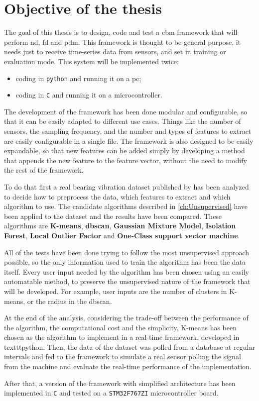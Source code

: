 \section{Objective of the thesis}
\label{sec:objectives}

The goal of this thesis is to design, code and test a \gls{cbm} framework that will perform \gls{nd}, \gls{fd} and \gls{pdm}. This framework is thought to be general purpose, it needs just to receive time-series data from sensors, and set in training or evaluation mode.
This system will be implemented twice:
\begin{itemize}
    \item  coding in \texttt{python} and running it on a \gls{pc};
    \item   coding in \texttt{C} and running it on a microcontroller.
\end{itemize}

The development of the framework has been done modular and configurable, so that it can be easily adapted to different use cases. Things like the number of sensors, the sampling frequency, and the number and types of features to extract are easily configurable in a single file. The framework is also designed to be easily expandable, so that new features can be added simply by developing a method that appends the new feature to the feature vector, without the need to modify the rest of the framework.

To do that first a real bearing vibration dataset published by \cite{IMSpaper} has been analyzed to decide how to preprocess the data, which features to extract and which algorithm to use. 
The candidate algorithms described in \autoref{ch:Unsupervised} have been applied to the dataset and the results have been compared. These algorithms are \textbf{K-means}, \textbf{\gls{dbscan}}, \textbf{Gaussian Mixture Model}, \textbf{Isolation Forest}, \textbf{Local Outlier Factor} and \textbf{One-Class support vector machine}. 

All of the tests have been done trying to follow the most unsupervised approach possible, so the only information used to train the algorithm has been the data itself. Every user input needed by the algorithm has been chosen using an easily automatable method, to preserve the unsupervised nature of the framework that will be developed. For example, user inputs are the number of clusters in K-means, or the radius in the \gls{dbscan}.

At the end of the analysis, considering the trade-off between the performance of the algorithm, the computational cost and the simplicity, K-means has been chosen as the algorithm to implement in a real-time framework, developed in texttt{python}. Then, the data of the dataset was polled from a database at regular intervals and fed to the framework to simulate a real sensor polling the signal from the machine and evaluate the real-time performance of the implementation.

After that, a version of the framework with simplified architecture has been implemented in \texttt{C} and tested on a \texttt{STM32F767ZI} microcontroller board.
